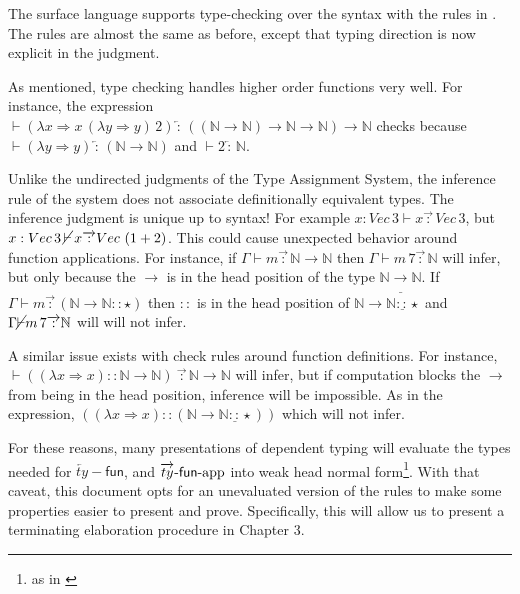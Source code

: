 The surface language supports \bidir{} type-checking over the syntax with the rules in .
The rules are almost the same as before, except that typing direction is now explicit in the judgment.
 
As mentioned, \bidir{} type checking handles higher order functions very well.
For instance, the expression $\vdash(\lambda x\Rightarrow x\,(\lambda y\Rightarrow y)\,2)\overleftarrow{\,:\,}\left(\left(\mathbb{N}\rightarrow\mathbb{N}\right)\rightarrow\mathbb{N}\rightarrow\mathbb{N}\right)\rightarrow\mathbb{N}$ checks because $\vdash(\lambda y\Rightarrow y)\overleftarrow{\,:\,}\left(\mathbb{N}\rightarrow\mathbb{N}\right)$ and $\vdash2\overleftarrow{\,:\,}\mathbb{N}$.
 
Unlike the undirected judgments of the Type Assignment System, the inference rule of the \bidir{} system does not associate definitionally equivalent types.
The inference judgment is unique up to syntax!
For example $x:Vec\,3\vdash x\overrightarrow{\,:\,}Vec\,3$, but $x:Vec\,3\, \cancel{\vdash}\, x\overrightarrow{\,:\,}Vec\,\left(1+2\right)$.
This could cause unexpected behavior around function applications.
For instance, if $\Gamma\vdash m\overrightarrow{\,:\,}\mathbb{N}\rightarrow\mathbb{N}$ then $\Gamma\vdash m\,7\overrightarrow{\,:\,}\mathbb{N}$ will infer, but only because the $\rightarrow$ is in the head position of the type $\mathbb{N}\underline{\rightarrow}\mathbb{N}$.
If $\Gamma\vdash m\overrightarrow{\,:\,}\left(\mathbb{N}\rightarrow\mathbb{N}::\star\right)$ then $::$ is in the head position of $\mathbb{N}\rightarrow\mathbb{N}\underline{::}\star$ and $\Gamma\cancel{\vdash}m\,7\overrightarrow{\,:\,}\mathbb{N}$ will will not infer.
 
A similar issue exists with check rules around function definitions.
For instance, $\vdash\left((\lambda x\Rightarrow x)::\mathbb{N}\rightarrow\mathbb{N}\right)\ \overrightarrow{\,:\,}\mathbb{N}\rightarrow\mathbb{N}$ will infer, but if computation blocks the $\rightarrow$ from being in the head position, inference will be impossible.
As in the expression, $\left((\lambda x\Rightarrow x)::\left(\mathbb{N}\rightarrow\mathbb{N}\underline{::}\star\right)\right)$ which will not infer.
 
For these reasons, many presentations of \bidir{} dependent typing will evaluate the types needed for $\overleftarrow{ty}-\mathsf{fun}$, and $\operatorname{\overrightarrow{ty}-\mathsf{fun}-app}$ into weak head normal form\footnote{as in \cite{COQUAND1996167}}.
With that caveat, this document opts for an unevaluated version of the rules to make some properties easier to present and prove.
Specifically, this will allow us to present a terminating elaboration procedure in Chapter 3.
 
